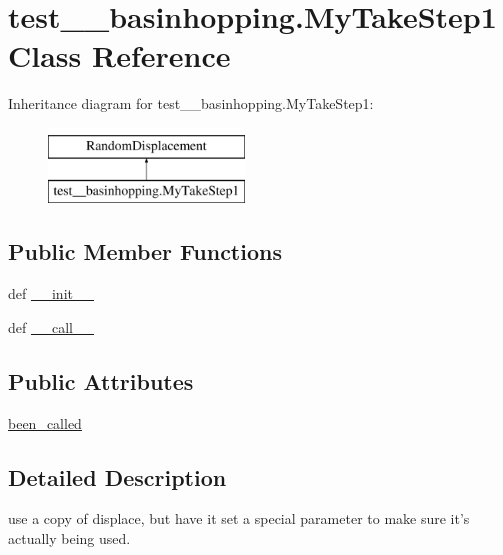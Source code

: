 \hypertarget{classtest____basinhopping_1_1MyTakeStep1}{}\section{test\+\_\+\+\_\+basinhopping.\+My\+Take\+Step1 Class Reference}
\label{classtest____basinhopping_1_1MyTakeStep1}
Inheritance diagram for test\+\_\+\+\_\+basinhopping.\+My\+Take\+Step1\+:\begin{figure}[H]
\begin{center}
\leavevmode
\includegraphics[height=2.000000cm]{classtest____basinhopping_1_1MyTakeStep1}
\end{center}
\end{figure}
\subsection*{Public Member Functions}
\begin{DoxyCompactItemize}
\item 
def \hyperlink{classtest____basinhopping_1_1MyTakeStep1_aafd35f53c07d8b068bcac852250fa603}{\+\_\+\+\_\+init\+\_\+\+\_\+}
\item 
def \hyperlink{classtest____basinhopping_1_1MyTakeStep1_a18b388158ba4fbd4ca908601800f72f0}{\+\_\+\+\_\+call\+\_\+\+\_\+}
\end{DoxyCompactItemize}
\subsection*{Public Attributes}
\begin{DoxyCompactItemize}
\item 
\hyperlink{classtest____basinhopping_1_1MyTakeStep1_acdb08578258362ed06392dfe95e4eecb}{been\+\_\+called}
\end{DoxyCompactItemize}


\subsection{Detailed Description}
\begin{DoxyVerb}use a copy of displace, but have it set a special parameter to
make sure it's actually being used.\end{DoxyVerb}
 

